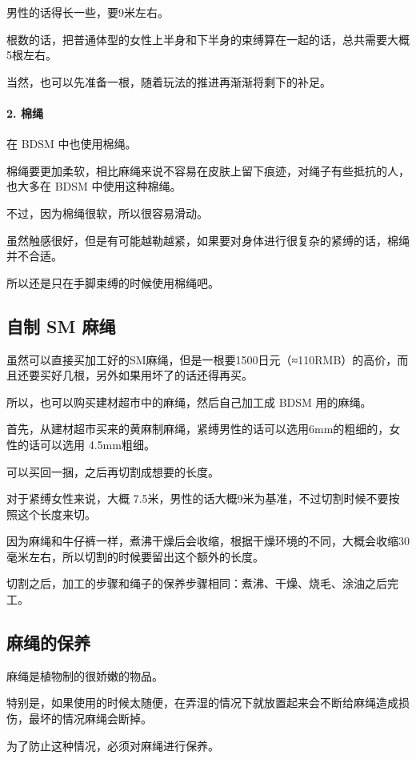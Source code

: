 \documentclass[12pt,UTF8]{ctexbook}
\begin{document}
男性的话得长一些，要9米左右。

根数的话，把普通体型的女性上半身和下半身的束缚算在一起的话，总共需要大概5根左右。

当然，也可以先准备一根，随着玩法的推进再渐渐将剩下的补足。

\paragraph{2. 棉绳}

在 BDSM 中也使用棉绳。

棉绳要更加柔软，相比麻绳来说不容易在皮肤上留下痕迹，对绳子有些抵抗的人，也大多在 BDSM 中使用这种棉绳。

不过，因为棉绳很软，所以很容易滑动。

虽然触感很好，但是有可能越勒越紧，如果要对身体进行很复杂的紧缚的话，棉绳并不合适。

所以还是只在手脚束缚的时候使用棉绳吧。

\subsection{自制 SM 麻绳}

虽然可以直接买加工好的SM麻绳，但是一根要1500日元（≈110RMB）的高价，而且还要买好几根，另外如果用坏了的话还得再买。

所以，也可以购买建材超市中的麻绳，然后自己加工成 BDSM 用的麻绳。

首先，从建材超市买来的黄麻制麻绳，紧缚男性的话可以选用6mm的粗细的，女性的话可以选用 4.5mm粗细。

可以买回一捆，之后再切割成想要的长度。

对于紧缚女性来说，大概 7.5米，男性的话大概9米为基准，不过切割时候不要按照这个长度来切。

因为麻绳和牛仔裤一样，煮沸干燥后会收缩，根据干燥环境的不同，大概会收缩30毫米左右，所以切割的时候要留出这个额外的长度。

切割之后，加工的步骤和绳子的保养步骤相同：煮沸、干燥、烧毛、涂油之后完工。

\subsection{麻绳的保养}

麻绳是植物制的很娇嫩的物品。

特别是，如果使用的时候太随便，在弄湿的情况下就放置起来会不断给麻绳造成损伤，最坏的情况麻绳会断掉。

为了防止这种情况，必须对麻绳进行保养。
\end{document}
